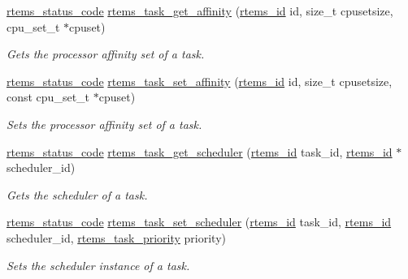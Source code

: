 \begin{DoxyCompactItemize}
\mbox{\hyperlink{group__ClassicStatus_ga545d41846817eaba6143d52ee4d9e9fe}{rtems\+\_\+status\+\_\+code}} \mbox{\hyperlink{group__ClassicTasks_gaf4a38e236136d5df6e5bef463a7e5506}{rtems\+\_\+task\+\_\+get\+\_\+affinity}} (\mbox{\hyperlink{group__ClassicTasks_gab20892b814dced7dd4e5b9bf42becd57}{rtems\+\_\+id}} id, size\+\_\+t cpusetsize, cpu\+\_\+set\+\_\+t $\ast$cpuset)
\begin{DoxyCompactList}\small\item\em Gets the processor affinity set of a task. \end{DoxyCompactList}\item 
\mbox{\hyperlink{group__ClassicStatus_ga545d41846817eaba6143d52ee4d9e9fe}{rtems\+\_\+status\+\_\+code}} \mbox{\hyperlink{group__ClassicTasks_ga33444117a6771a55307452862a1ca944}{rtems\+\_\+task\+\_\+set\+\_\+affinity}} (\mbox{\hyperlink{group__ClassicTasks_gab20892b814dced7dd4e5b9bf42becd57}{rtems\+\_\+id}} id, size\+\_\+t cpusetsize, const cpu\+\_\+set\+\_\+t $\ast$cpuset)
\begin{DoxyCompactList}\small\item\em Sets the processor affinity set of a task. \end{DoxyCompactList}\item 
\mbox{\hyperlink{group__ClassicStatus_ga545d41846817eaba6143d52ee4d9e9fe}{rtems\+\_\+status\+\_\+code}} \mbox{\hyperlink{group__ClassicTasks_gae1825025c9bc70a32d9e223759586b9d}{rtems\+\_\+task\+\_\+get\+\_\+scheduler}} (\mbox{\hyperlink{group__ClassicTasks_gab20892b814dced7dd4e5b9bf42becd57}{rtems\+\_\+id}} task\+\_\+id, \mbox{\hyperlink{group__ClassicTasks_gab20892b814dced7dd4e5b9bf42becd57}{rtems\+\_\+id}} $\ast$scheduler\+\_\+id)
\begin{DoxyCompactList}\small\item\em Gets the scheduler of a task. \end{DoxyCompactList}\item 
\mbox{\hyperlink{group__ClassicStatus_ga545d41846817eaba6143d52ee4d9e9fe}{rtems\+\_\+status\+\_\+code}} \mbox{\hyperlink{group__ClassicTasks_ga1ca20ee9675ee6604edb59ca9c1aa763}{rtems\+\_\+task\+\_\+set\+\_\+scheduler}} (\mbox{\hyperlink{group__ClassicTasks_gab20892b814dced7dd4e5b9bf42becd57}{rtems\+\_\+id}} task\+\_\+id, \mbox{\hyperlink{group__ClassicTasks_gab20892b814dced7dd4e5b9bf42becd57}{rtems\+\_\+id}} scheduler\+\_\+id, \mbox{\hyperlink{group__ClassicTasks_gaa80a0c0938307d1e99d0eb5fee765b47}{rtems\+\_\+task\+\_\+priority}} priority)
\begin{DoxyCompactList}\small\item\em Sets the scheduler instance of a task. \end{DoxyCompactList}\item 

\end{DoxyCompactItemize}
